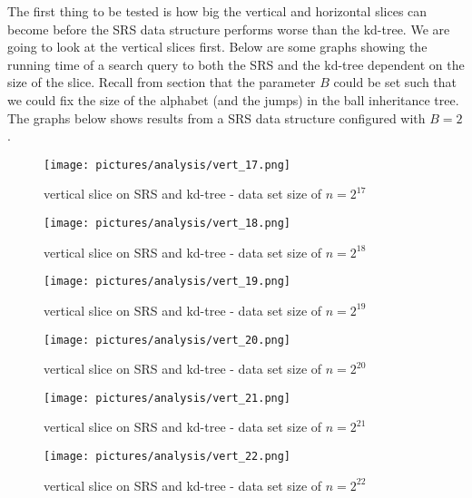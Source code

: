 The first thing to be tested is how big the vertical and horizontal slices can become before the SRS data structure performs worse than the kd-tree. We are going to look at the vertical slices first. Below are some graphs showing the running time of a search query to both the SRS and the kd-tree dependent on the size of the slice. Recall from section  that the parameter $B$ could be set such that we could fix the size of the alphabet (and the jumps) in the ball inheritance tree. The graphs below shows results from a SRS data structure configured with $B=2$. 


\begin{figure}[h]
    \centering
    \texttt{[image: pictures/analysis/vert\_17.png]}
    \caption{vertical slice on SRS and kd-tree - data set size of $n=2^{17}$}\label{fig:vert_17}
\end{figure}

\begin{figure}[h]
    \centering
    \texttt{[image: pictures/analysis/vert\_18.png]}
    \caption{vertical slice on SRS and kd-tree - data set size of $n=2^{18}$}\label{fig:vert_18}
\end{figure}

\begin{figure}[h]
    \centering
    \texttt{[image: pictures/analysis/vert\_19.png]}
    \caption{vertical slice on SRS and kd-tree - data set size of $n=2^{19}$}\label{fig:vert_19}
\end{figure}

\begin{figure}[h]
    \centering
    \texttt{[image: pictures/analysis/vert\_20.png]}
    \caption{vertical slice on SRS and kd-tree - data set size of $n=2^{20}$}\label{fig:vert_20}
\end{figure}

\begin{figure}[h]
    \centering
    \texttt{[image: pictures/analysis/vert\_21.png]}
    \caption{vertical slice on SRS and kd-tree - data set size of $n=2^{21}$}\label{fig:vert_21}
\end{figure}

\begin{figure}[h]
    \centering
    \texttt{[image: pictures/analysis/vert\_22.png]}
    \caption{vertical slice on SRS and kd-tree - data set size of $n=2^{22}$}\label{fig:vert_22}
\end{figure}

